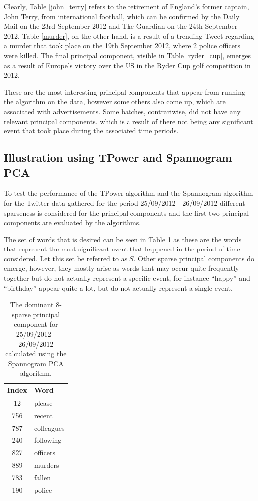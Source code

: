 \documentclass[11pt,a4paper]{article}
\begin{document}
Clearly, Table \ref{john_terry} refers to the retirement of England's former captain, John Terry, from international football, which can be confirmed by the Daily Mail on the 23rd September 2012 and The Guardian on the 24th September 2012. Table \ref{murder}, on the other hand, is a result of a trending Tweet regarding a murder that took place on the 19th September 2012, where 2 police officers were killed. The final principal component, visible in Table \ref{ryder_cup}, emerges as a result of Europe's victory over the US in the Ryder Cup golf competition in 2012. 

These are the most interesting principal components that appear from running the algorithm on the data, however some others also come up, which are associated with advertisements. Some batches, contrariwise, did not have any relevant principal components, which is a result of there not being any significant event that took place during the associated time periods.

\subsection{Illustration using TPower and Spannogram PCA}
To test the performance of the TPower algorithm and the Spannogram algorithm for the Twitter data gathered for the period 25/09/2012 - 26/09/2012 different sparseness is considered for the principal components and the first two principal components are evaluated by the algorithms. 

The set of words that is desired can be seen in Table \ref{murder_8} as these are the words that represent the most significant event that happened in the period of time considered. Let this set be referred to as $S$. Other sparse principal components do emerge, however, they mostly arise as words that may occur quite frequently together but do not actually represent a specific event, for instance ``happy'' and ``birthday'' appear quite  a lot, but do not actually represent a single event. 

\begin{table}[H]
\center
\begin{tabular}{| c l |}
\hline
Index & Word \\
\hline
12 & please\\
756 & recent\\
787 & colleagues\\
240 & following\\
827 & officers\\
889 & murders\\
783 & fallen\\
190 & police\\
\hline
\end{tabular}
\caption{The dominant 8-sparse principal component for 25/09/2012 - 26/09/2012 calculated using the Spannogram PCA algorithm.}
\label{murder_8}
\end{table}
\end{document}
